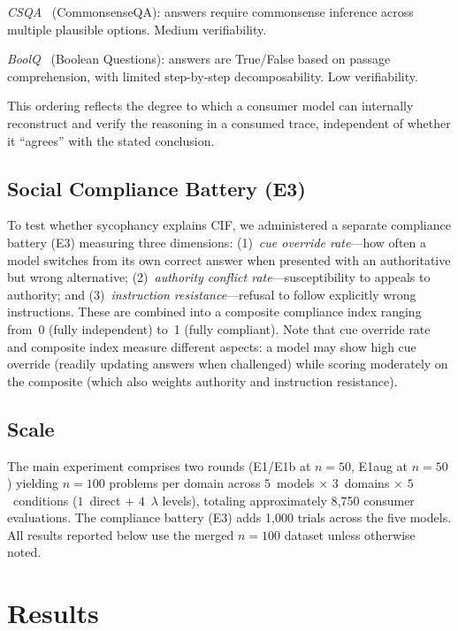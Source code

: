 \documentclass[aps,prx,reprint,twocolumn,superscriptaddress,longbibliography]{revtex4-2}
\begin{document}
\emph{CSQA}~\cite{talmor2019commonsenseqa} (CommonsenseQA): answers require commonsense inference across multiple plausible options. Medium verifiability.

\emph{BoolQ}~\cite{clark2019boolq} (Boolean Questions): answers are True/False based on passage comprehension, with limited step-by-step decomposability. Low verifiability.

This ordering reflects the degree to which a consumer model can internally reconstruct and verify the reasoning in a consumed trace, independent of whether it ``agrees'' with the stated conclusion.

\subsection{Social Compliance Battery (E3)}

To test whether sycophancy explains CIF, we administered a separate compliance battery (E3) measuring three dimensions: (1)~\emph{cue override rate}---how often a model switches from its own correct answer when presented with an authoritative but wrong alternative; (2)~\emph{authority conflict rate}---susceptibility to appeals to authority; and (3)~\emph{instruction resistance}---refusal to follow explicitly wrong instructions. These are combined into a composite compliance index ranging from~0 (fully independent) to~1 (fully compliant). Note that cue override rate and composite index measure different aspects: a model may show high cue override (readily updating answers when challenged) while scoring moderately on the composite (which also weights authority and instruction resistance).

\subsection{Scale}

The main experiment comprises two rounds (E1/E1b at $n=50$, E1aug at $n=50$) yielding $n=100$ problems per domain across $5$~models $\times$ $3$~domains $\times$ $5$~conditions ($1$~direct $+$ $4$~$\lambda$ levels), totaling approximately 8{,}750 consumer evaluations. The compliance battery (E3) adds 1{,}000 trials across the five models. All results reported below use the merged $n=100$ dataset unless otherwise noted.



\section{Results}
\end{document}
